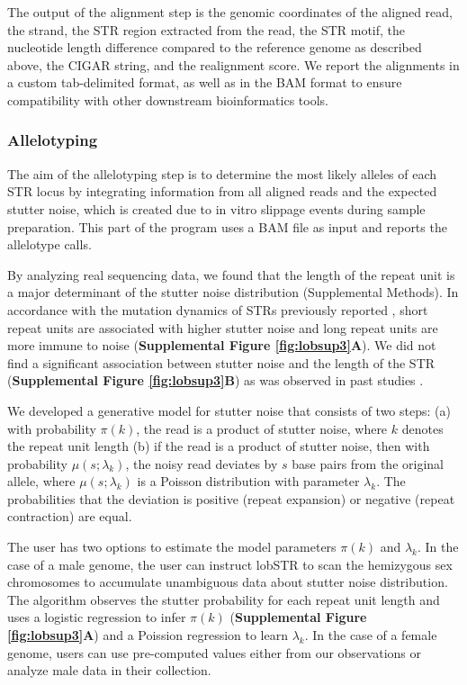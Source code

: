 {The output of the alignment step is the genomic coordinates of the aligned read, the strand, the STR region extracted from the read, the STR motif, the nucleotide length difference compared to the reference genome as described above, the CIGAR string, and the realignment score. We report the alignments in a custom tab-delimited format, as well as in the BAM format \cite{LiZhaoLinEtAl2009} to ensure compatibility with other downstream bioinformatics tools.

\subsubsection{Allelotyping}
The aim of the allelotyping step is to determine the most likely alleles of each STR locus by integrating information from all aligned reads and the expected stutter noise, which is created due to in vitro slippage events during sample preparation. This part of the program uses a BAM file as input and reports the allelotype calls.

By analyzing real sequencing data, we found that the length of the repeat unit is a major determinant of the stutter noise distribution (Supplemental Methods). In accordance with the mutation dynamics of STRs previously reported \cite{Ellegren2004}, short repeat units are associated with higher stutter noise and long repeat units are more immune to noise (\textbf{Supplemental Figure \ref{fig:lobsup3}A}). We did not find a significant association between stutter noise and the length of the STR (\textbf{Supplemental Figure \ref{fig:lobsup3}B}) as was observed in past studies \cite{HaugeLitt1993}.

We developed a generative model for stutter noise that consists of two steps: (a) with probability $\pi(k)$, the read is a product of stutter noise, where $k$ denotes the repeat unit length (b) if the read is a product of stutter noise, then with probability $\mu(s; \lambda_k)$, the noisy read deviates by $s$ base pairs from the original allele, where $\mu(s; \lambda_k)$ is a Poisson distribution with parameter $\lambda_k$. The probabilities that the deviation is positive (repeat expansion) or negative (repeat contraction) are equal. 

The user has two options to estimate the model parameters $\pi(k)$ and $\lambda_k$. In the case of a male genome, the user can instruct lobSTR to scan the hemizygous sex chromosomes to accumulate unambiguous data about stutter noise distribution. The algorithm observes the stutter probability for each repeat unit length and uses a logistic regression to infer $\pi(k)$ (\textbf{Supplemental Figure \ref{fig:lobsup3}A}) and a Poission regression to learn $\lambda_k$. In the case of a female genome, users can use pre-computed values either from our observations or analyze male data in their collection. 

}
